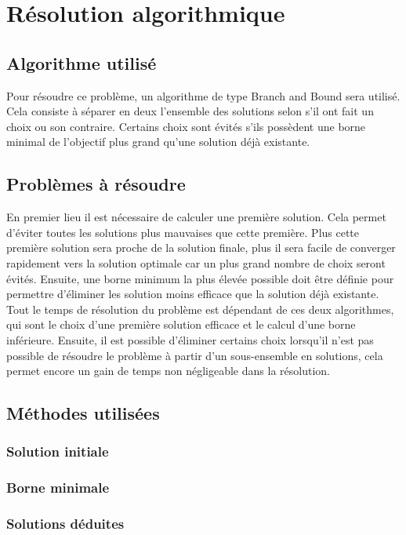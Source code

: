 \documentclass[a4paper, 12pt]{report}
\begin{document}
\chapter{Résolution algorithmique}
\section{Algorithme utilisé}

Pour résoudre ce problème, un algorithme de type Branch and Bound sera utilisé.
Cela consiste à séparer en deux l'ensemble des solutions selon s'il ont fait un choix ou son contraire.
Certains choix sont évités s'ils possèdent une borne minimal de l'objectif plus grand qu'une solution déjà existante. 

\section{Problèmes à résoudre}
En premier lieu il est nécessaire de calculer une première solution. 
Cela permet d'éviter toutes les solutions plus mauvaises que cette première.
Plus cette première solution sera proche de la solution finale, 
plus il sera facile de converger rapidement vers la solution optimale car un plus grand nombre de choix seront évités.
\newline{}
\newline{}
Ensuite, une borne minimum la plus élevée possible doit être définie 
pour permettre d'éliminer les solution moins efficace que la solution déjà existante. 
Tout le temps de résolution du problème est dépendant de ces deux algorithmes, 
qui sont le choix d'une première solution efficace et le calcul d'une borne inférieure. 
\newline{}
\newline{}
Ensuite, il est possible d'éliminer certains choix lorsqu'il n'est pas possible de résoudre le problème 
à partir d'un sous-ensemble en solutions, cela permet encore un gain de temps non négligeable dans la résolution.

\section{Méthodes utilisées}
\subsection{Solution initiale}


\subsection{Borne minimale}



\subsection{Solutions déduites}
\end{document}
